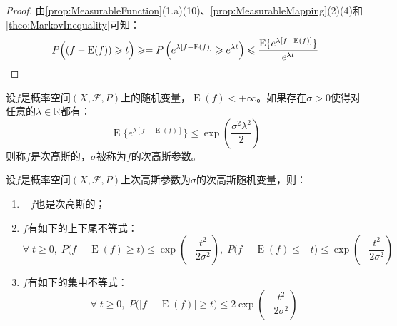 \begin{proof}
	由\cref{prop:MeasurableFunction}(1.a)(10)、\cref{prop:MeasurableMapping}(2)(4)和\cref{theo:MarkovInequality}可知：
	\begin{equation*}
		P\Big((f-\operatorname{E}(f))\geqslant t\Big)\geqslant=P\left(e^{\lambda[f-\operatorname{E}(f)]}\geqslant e^{\lambda t}\right)\leqslant\frac{\operatorname{E}\{e^{\lambda[f-\operatorname{E}(f)]}\}}{e^{\lambda t}}\qedhere
	\end{equation*}
\end{proof}
\begin{definition}
	设$f$是概率空间$(X,\mathscr{F},P)$上的随机变量，$\operatorname{E}(f)<+\infty$。如果存在$\sigma>0$使得对任意的$\lambda\in\mathbb{R}^{}$都有：
	\begin{equation*}
		\operatorname{E}\{e^{\lambda[f-\operatorname{E}(f)]}\}\leqslant\exp\left(\frac{\sigma^2\lambda^2}{2}\right)
	\end{equation*}
	则称$f$是次高斯的，$\sigma$被称为$f$的次高斯参数。
\end{definition}
\begin{property}
	设$f$是概率空间$(X,\mathscr{F},P)$上次高斯参数为$\sigma$的次高斯随机变量，则：
	\begin{enumerate}
		\item $-f$也是次高斯的；
		\item $f$有如下的上下尾不等式：
		\begin{equation*}
			\forall\;t\geqslant0,\;P\Big(f-\operatorname{E}(f)\geqslant t\Big)\leqslant\exp\left(-\frac{t^2}{2\sigma^2}\right),\;P\Big(f-\operatorname{E}(f)\leqslant -t\Big)\leqslant\exp\left(-\frac{t^2}{2\sigma^2}\right)
		\end{equation*}
		\item $f$有如下的集中不等式：
		\begin{equation*}
			\forall\;t\geqslant0,\;P\Big(|f-\operatorname{E}(f)|\geqslant t\Big)\leqslant2\exp\left(-\frac{t^2}{2\sigma^2}\right)
		\end{equation*}
	\end{enumerate}
\end{property}
